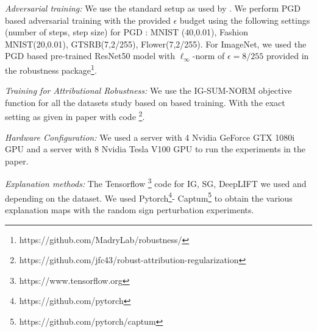 \documentclass[letterpaper]{article} %
\begin{document}
\textit{Adversarial training:} We use the standard setup as used by \citep{chen2019robust}. We perform PGD based adversarial training with the provided $\epsilon$ budget using the following settings (number of steps, step size) for PGD : MNIST (40,0.01), Fashion MNIST(20,0.01), GTSRB(7,2/255), Flower(7,2/255). For ImageNet, we used the PGD based pre-trained ResNet50 model with $\ell_{\infty}$-norm of $\epsilon = 8/255$ provided in the robustness package\footnote{https://github.com/MadryLab/robustness/}.

\textit{Training for Attributional Robustness:} We use the IG-SUM-NORM objective function for all the datasets study based on \citep{chen2019robust} based training. With the exact setting as given in paper with code \footnote{https://github.com/jfc43/robust-attribution-regularization}.

\textit{Hardware Configuration:} We used a server with 4 Nvidia GeForce GTX 1080i GPU and a server with 8 Nvidia Tesla V100 GPU to run the experiments in the paper.

\textit{Explanation methods:} The Tensorflow \footnote{https://www.tensorflow.org} code for  IG, SG, DeepLIFT we used \citep{chen2019robust} and \citet{ghorbani2018interpretation} depending on the dataset. We used Pytorch\footnote{https://github.com/pytorch}- Captum\footnote{https://github.com/pytorch/captum} to obtain the various explanation maps with the random sign perturbation experiments.
\end{document}
